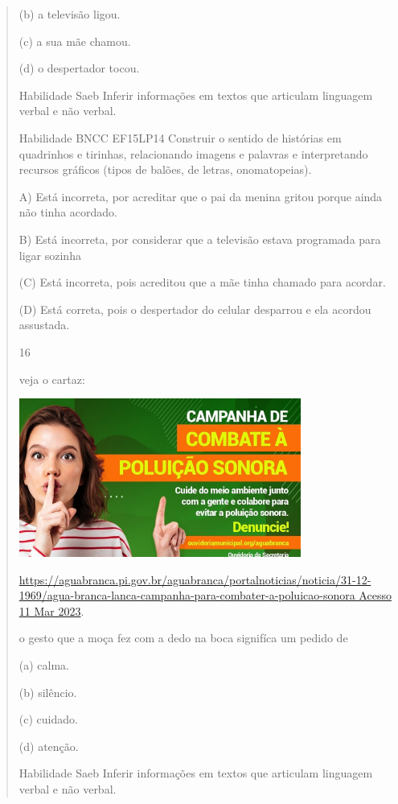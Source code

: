 \begin{verse}
{{{{{{{{{{{{{{{{{{{{(b) a televisão ligou.

(c) a sua mãe chamou.

(d) o despertador tocou.

\protect\hypertarget{_Hlk129586447}{}{}Habilidade Saeb Inferir
informações em textos que articulam linguagem verbal e não verbal.

Habilidade BNCC EF15LP14 Construir o sentido de histórias em quadrinhos
e tirinhas, relacionando imagens e palavras e interpretando recursos
gráficos (tipos de balões, de letras, onomatopeias).

A) Está incorreta, por acreditar que o pai da menina gritou porque ainda
não tinha acordado.

B) Está incorreta, por considerar que a televisão estava programada para
ligar sozinha

(C) Está incorreta, pois acreditou que a mãe tinha chamado para acordar.

(D) Está correta, pois o despertador do celular desparrou e ela acordou
assustada.

\num{16}

veja o cartaz:

\includegraphics[width=3.64744in,height=2.05233in]{media/image173.png}

\href{https://aguabranca.pi.gov.br/aguabranca/portalnoticias/noticia/31-12-1969/agua-branca-lanca-campanha-para-combater-a-poluicao-sonora\%20Acesso\%2011\%20Mar\%202023}{https://aguabranca.pi.gov.br/aguabranca/portalnoticias/noticia/31-12-1969/agua-branca-lanca-campanha-para-combater-a-poluicao-sonora
Acesso 11 Mar 2023}.

o gesto que a moça fez com a dedo na boca signifíca um pedido de

(a) calma.

(b) silêncio.

(c) cuidado.

(d) atenção.

Habilidade Saeb Inferir informações em textos que articulam linguagem
verbal e não verbal.

}}}}}}}}}}}}}}}}}}}}
\end{verse}
